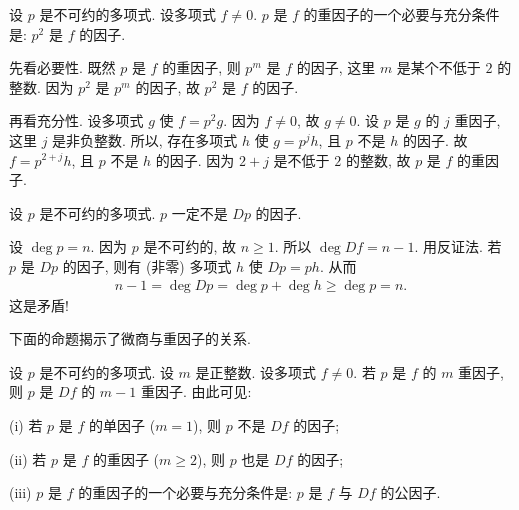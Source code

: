 \begin{proposition}
    设 $p$ 是不可约的多项式. 设多项式 $f \neq 0$. $p$ 是 $f$ 的重因子的一个必要与充分条件是: $p^2$ 是 $f$ 的因子.
\end{proposition}

\begin{pf}
    先看必要性. 既然 $p$ 是 $f$ 的重因子, 则 $p^m$ 是 $f$ 的因子, 这里 $m$ 是某个不低于 $2$ 的整数. 因为 $p^2$ 是 $p^m$ 的因子, 故 $p^2$ 是 $f$ 的因子.

    再看充分性. 设多项式 $g$ 使 $f = p^2 g$. 因为 $f \neq 0$, 故 $g \neq 0$. 设 $p$ 是 $g$ 的 $j$ 重因子, 这里 $j$ 是非负整数. 所以, 存在多项式 $h$ 使 $g = p^j h$, 且 $p$ 不是 $h$ 的因子. 故 $f = p^{2+j} h$, 且 $p$ 不是 $h$ 的因子. 因为 $2+j$ 是不低于 $2$ 的整数, 故 $p$ 是 $f$ 的重因子.
\end{pf}

\begin{proposition}
    设 $p$ 是不可约的多项式. $p$ 一定不是 $Dp$ 的因子.
\end{proposition}

\begin{pf}
    设 $\deg p = n$. 因为 $p$ 是不可约的, 故 $n \geq 1$. 所以 $\deg Df = n - 1$. 用反证法. 若 $p$ 是 $Dp$ 的因子, 则有 (非零) 多项式 $h$ 使 $Dp = ph$. 从而
    \begin{align*}
        n - 1 = \deg Dp = \deg p + \deg h \geq \deg p = n.
    \end{align*}
    这是矛盾!
\end{pf}

下面的命题揭示了微商与重因子的关系.

\begin{proposition}
    设 $p$ 是不可约的多项式. 设 $m$ 是正整数. 设多项式 $f \neq 0$. 若 $p$ 是 $f$ 的 $m$ 重因子, 则 $p$ 是 $Df$ 的 $m-1$ 重因子. 由此可见:

    (i) 若 $p$ 是 $f$ 的单因子 ($m = 1$), 则 $p$ 不是 $Df$ 的因子;

    (ii) 若 $p$ 是 $f$ 的重因子 ($m \geq 2$), 则 $p$ 也是 $Df$ 的因子;

    (iii) $p$ 是 $f$ 的重因子的一个必要与充分条件是: $p$ 是 $f$ 与 $Df$ 的公因子.
\end{proposition}

